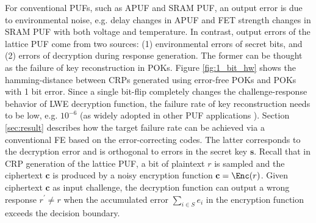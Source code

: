 For conventional PUFs, such as APUF and SRAM PUF, an output error is due to environmental noise, e.g. delay changes in APUF and FET strength changes in SRAM PUF with both voltage and temperature.
In contrast, output errors of the lattice PUF come from two sources: (1) environmental errors of secret bits, and (2) errors of decryption during response generation.
The former can be thought as the failure of key reconstruction in POKs.
Figure \ref{fig:1_bit_hw} shows the hamming-distance between CRPs generated using error-free POKs and POKs with 1 bit error.
Since a single bit-flip completely changes the challenge-response behavior of LWE decryption function, the failure rate of key reconstruction needs to be low, e.g. $10^{-6}$ (as widely adopted in other PUF applications \cite{maes2012pufky}).
Section \ref{sec:result} describes how the target failure rate can be achieved via a conventional FE based on the error-correcting codes.
The latter corresponds to the decryption error and is orthogonal to errors in the secret key $\mathbf{s}$. 
Recall that in CRP generation of the lattice PUF, a bit of plaintext $r$ is sampled and the ciphertext $\mathbf{c}$ is produced by a noisy encryption function $\mathbf{c}=\Enc(r)$. 
Given ciphertext $\mathbf{c}$ as input challenge, the decryption function can output a wrong response $r^\prime\neq r$ when the accumulated error $\sum_{i\in S} e_i$ in the encryption function exceeds the decision boundary.


